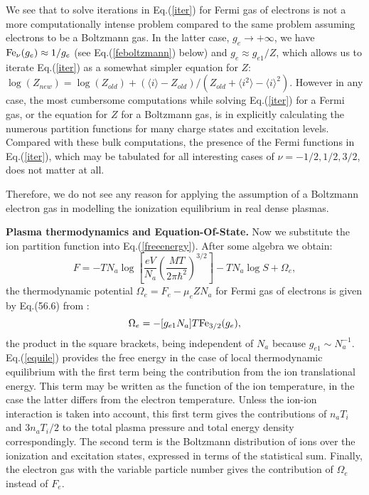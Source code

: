 We see that to solve iterations in Eq.(\ref{iter}) for Fermi gas of electrons is not a
more computationally intense problem compared to the same problem assuming electrons 
to be a Boltzmann gas. In the latter case, $g_e \to +\infty$, we have ${\rm Fe}_\nu(g_e) \approx 1/g_e$
(see Eq.(\ref{feboltzmann}) below) and $g_e \approx g_{e1}/Z$, which allows us to iterate Eq.(\ref{iter})
as a somewhat simpler equation for $Z$:
$\log (Z_{new})=\log(Z_{old})+(\langle i\rangle-Z_{old})/(Z_{old}+\langle i^2\rangle-\langle i\rangle^2)$. However in any case, the most cumbersome computations 
while solving Eq.(\ref{iter}) for a Fermi gas, or the equation for $Z$ for a Boltzmann gas, is in explicitly calculating the 
numerous partition functions for many charge
states and excitation levels. Compared with these bulk computations, the presence of the Fermi functions in Eq.(\ref{iter}), which may be tabulated 
for all interesting cases of $\nu=-1/2,1/2,3/2$, %
does not matter at all.

Therefore, we 
do not see any reason for applying the assumption of a Boltzmann electron gas in modelling the ionization equilibrium
in real dense plasmas.

{\bf Plasma thermodynamics and Equation-Of-State.} Now we substitute the ion partition function into Eq.(\ref{freeenergy}). After some algebra we obtain:
\begin{equation}\label{equile}
F = -TN_a\log\left[\frac{eV}{N_a}\left(\frac{MT}{2\pi \hbar^2}\right)^{3/2}\right]-TN_a\log S +\Omega_e,
\end{equation}
the thermodynamic potential $\Omega_e=F_e -\mu_eZN_a$ for Fermi gas of electrons is given by Eq.(56.6) from \cite{ll}:
\begin{equation}
\Omega_e = -[g_{e1}N_a]T{\rm Fe}_{3/2}(g_e),
\end{equation}
the product in the square brackets, being independent of $N_a$ because $g_{e1}\sim N_a^{-1}$.  Eq.(\ref{equile}) provides the free energy in the case of
local thermodynamic equilibrium with the first term being the contribution from the ion translational energy. This term may be written as the function of the ion 
temperature, in the case the latter differs from the electron temperature. Unless the ion-ion interaction is taken into account, this first term gives the contributions 
of $n_aT_i$ and $3n_aT_i/2$ to the total plasma pressure and total energy density correspondingly. The second term is
the Boltzmann distribution of ions over the ionization and excitation states, expressed in terms of the statistical sum. Finally, the electron gas with the
variable particle number gives the contribution of $\Omega_e$ instead of $F_e$. 

